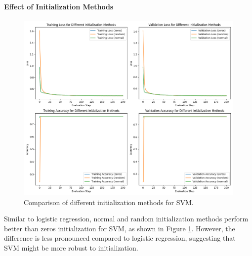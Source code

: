\documentclass[journal, a4paper]{IEEEtran}
\begin{document}
\paragraph{Effect of Initialization Methods}
\begin{figure}[H]
\centering
\includegraphics[width=\linewidth]{svm_init_methods.png}
\caption{Comparison of different initialization methods for SVM.}
\label{fig:svm_init}
\end{figure}

Similar to logistic regression, normal and random initialization methods perform better than zeros initialization for SVM, as shown in Figure \ref{fig:svm_init}. However, the difference is less pronounced compared to logistic regression, suggesting that SVM might be more robust to initialization.
\end{document}
